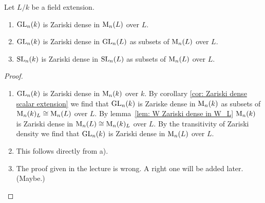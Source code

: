 \begin{prop}
 Let $L/k$ be a field extension.
 \begin{enumerate}[label=\emph{\alph*)},leftmargin=*]
  \item
   $\operatorname{GL}_n(k)$ is Zariski dense in $\operatorname{M}_n(L)$ over $L$.
  \item
   $\operatorname{GL}_n(k)$ is Zariski dense in $\operatorname{GL}_n(L)$ as subsets of $\operatorname{M}_n(L)$ over $L$.
  \item
   $\operatorname{SL}_n(k)$ is Zariski dense in $\operatorname{SL}_n(L)$ as subsets of $\operatorname{M}_n(L)$ over $L$.
 \end{enumerate}
\end{prop}
\begin{proof}
 \begin{enumerate}[label=\emph{\alph*)},leftmargin=*]
  \item
   $\operatorname{GL}_n(k)$ is Zariski dense in $\operatorname{M}_n(k)$ over $k$. By corollary \ref{cor: Zariski dense scalar extension} we find that $\operatorname{GL}_n(k)$ is Zariske dense in $\operatorname{M}_n(k)$ as subsets of $\operatorname{M}_n(k)_L \cong \operatorname{M}_n(L)$ over $L$. By \mbox{lemma \ref{lem: W Zariski dense in W_L}} $\operatorname{M}_n(k)$ is Zariski dense in $\operatorname{M}_n(L) \cong \operatorname{M}_n(k)_L$ over $L$. By the transitivity of Zariski density we find that $\operatorname{GL}_n(k)$ is Zariski dense in $\operatorname{M}_n(L)$ over $L$.
  \item
   This follows directly from a).
  \item
   The proof given in the lecture is wrong. A right one will be added later. (Maybe.)
  \qedhere
 \end{enumerate}
\end{proof}



